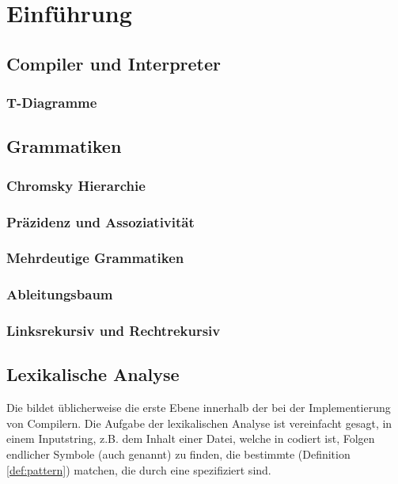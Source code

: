 \chapter{Einführung}
\section{Compiler und Interpreter}
\subsection{T-Diagramme}
\section{Grammatiken}
\subsection{Chromsky Hierarchie}
\subsection{Präzidenz und Assoziativität}
\subsection{Mehrdeutige Grammatiken}
\subsection{Ableitungsbaum}
\subsection{Linksrekursiv und Rechtrekursiv}
\section{Lexikalische Analyse}
\label{sec:lexikalische_analyse}

Die  bildet üblicherweise die erste Ebene innerhalb der  bei der Implementierung von Compilern. Die Aufgabe der lexikalischen Analyse ist vereinfacht gesagt, in einem Inputstring, z.B. dem Inhalt einer Datei, welche in  codiert ist, Folgen endlicher Symbole (auch  genannt) zu finden, die bestimmte  (Definition \ref{def:pattern}) matchen, die durch eine  spezifiziert sind.

